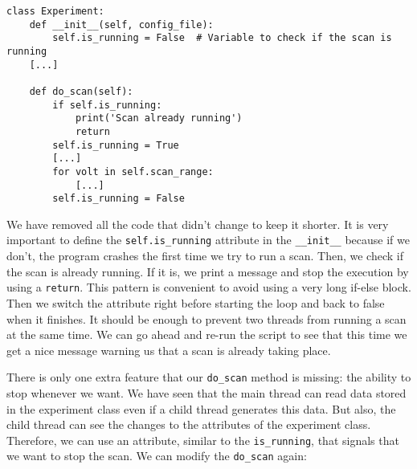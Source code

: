 \begin{verbatim}
class Experiment:
    def __init__(self, config_file):
        self.is_running = False  # Variable to check if the scan is running
    [...]

    def do_scan(self):
        if self.is_running:
            print('Scan already running')
            return
        self.is_running = True
        [...]
        for volt in self.scan_range:
            [...]
        self.is_running = False
\end{verbatim}

We have removed all the code that didn't change to keep it shorter. It is very important to define the \texttt{self.is\_running} attribute in the \texttt{\_\_init\_\_} because if we don't, the program crashes the first time we try to run a scan. Then, we check if the scan is already running. If it is, we print a message and stop the execution by using a \texttt{return}. This pattern is convenient to avoid using a very long if-else block. Then we switch the attribute right before starting the loop and back to false when it finishes. It should be enough to prevent two threads from running a scan at the same time. We can go ahead and re-run the script to see that this time we get a nice message warning us that a scan is already taking place.


There is only one extra feature that our \texttt{do\_scan} method is missing: the ability to stop whenever we want. We have seen that the main thread can read data stored in the experiment class even if a child thread generates this data. But also, the child thread can see the changes to the attributes of the experiment class. Therefore, we can use an attribute, similar to the \texttt{is\_running}, that signals that we want to stop the scan. We can modify the \texttt{do\_scan} again:

